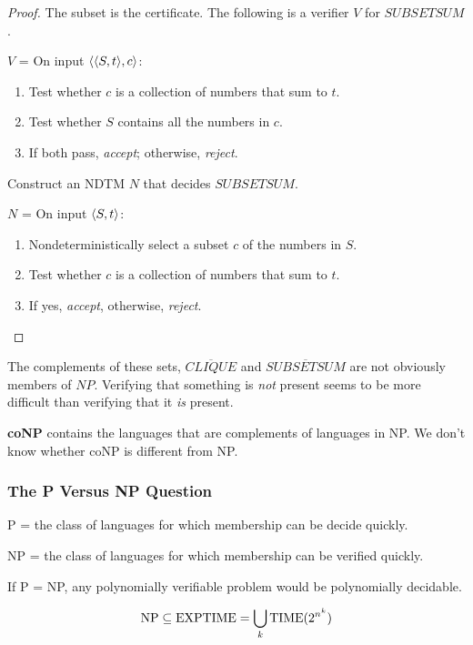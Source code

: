 \begin{mdframed}
\begin{proof}
The subset is the certificate. The following is a verifier $V$ for $SUBSETSUM$.

\medskip
$V$ = On input $\langle{\langle{S, t}\rangle, c}\rangle$:
\begin{enumerate}
\item Test whether $c$ is a collection of numbers that sum to $t$.
\item Test whether $S$ contains all the numbers in $c$.
\item If both pass, \textit{accept}; otherwise, \textit{reject}.
\end{enumerate}

\medskip
Construct an NDTM $N$ that decides $SUBSETSUM$.

\medskip
$N$ = On input $\langle{S, t}\rangle$:
\begin{enumerate}
\item Nondeterministically select a subset $c$ of the numbers in $S$.
\item Test whether $c$ is a collection of numbers that sum to $t$.
\item If yes, \textit{accept}, otherwise, \textit{reject}.
\end{enumerate}

\end{proof}
\end{mdframed}

{\color{blue} The complements of these sets, $\overline{CLIQUE}$ and $\overline{SUBSETSUM}$ are not obviously members of $NP$. Verifying that something is \textit{not} present seems to be more difficult than verifying that it \textit{is} present.}

\textbf{coNP} contains the languages that are complements of languages in NP. We don't know whether coNP is different from NP.

\subsubsection{The P Versus NP Question}

P = the class of languages for which membership can be decide quickly.

NP = the class of languages for which membership can be verified quickly.

If P = NP, any polynomially verifiable problem would be polynomially decidable.

\[
\text{NP} \subseteq \text{EXPTIME} = \bigcup_k \text{TIME}(2^{n^k})
\]

